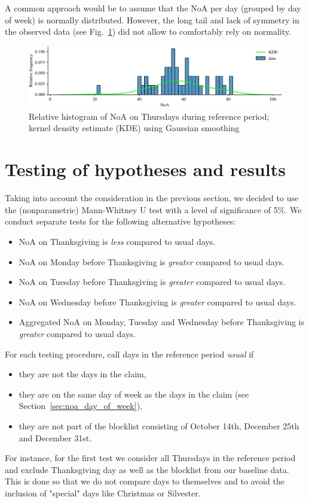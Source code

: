 \documentclass{article}
\begin{document}
A common approach would be to assume that the NoA per day (grouped by day of
week) is normally distributed. However, the long tail and lack of symmetry in
the observed data (see Fig.~\ref{fig:accidents_on_thursdays}) did not allow to
comfortably rely on normality.

\begin{figure}[H]
  \centering
  \includegraphics[width=\textwidth]{../fig/accidents_on_thursdays.pdf}
  \caption{Relative histogram of NoA on Thursdays during
  reference period; kernel density estimate (KDE) using Gaussian smoothing}
  \label{fig:accidents_on_thursdays}
\end{figure}

\section{Testing of hypotheses and results}
Taking into account the consideration in the previous section, we decided to use
the (nonparametric) Mann-Whitney U test with a level of significance of 5\%. We
conduct separate tests for the following alternative hypotheses:
\begin{itemize}
  \item NoA on Thanksgiving is \emph{less} compared to usual days.
  \item NoA on Monday before Thanksgiving is \emph{greater} compared to usual
    days.
  \item NoA on Tuesday before Thanksgiving is \emph{greater} compared to usual
    days.
  \item NoA on Wednesday before Thanksgiving is \emph{greater} compared to usual
    days.
  \item Aggregated NoA on Monday, Tuesday and Wednesday before Thanksgiving is
    \emph{greater} compared to usual days.
\end{itemize}

\pagebreak
For each testing procedure, call days in the reference period \emph{usual} if
\begin{itemize}
  \item they are not the days in the claim,
  \item they are on the same day of week as the days in the claim (see Section~\ref{sec:noa_day_of_week}),
  \item they are not part of the blocklist consisting of October 14th, December
    25th and December 31st.
\end{itemize}
For instance, for the first test we consider all Thursdays in the reference
period and exclude Thanksgiving day as well as the blocklist from our baseline
data. This is done so that we do not compare days to themselves and to avoid the
inclusion of "special" days like Christmas or Silvester.
\end{document}
